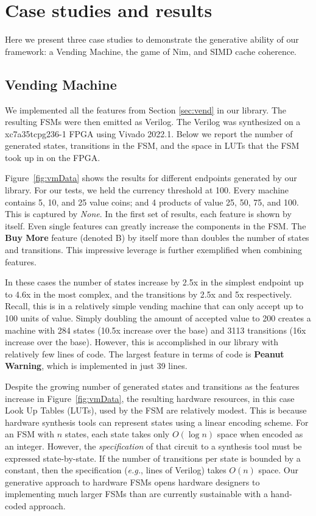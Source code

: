 \documentclass[sigplan,anonymous,review]{acmart}
\begin{document}
\section{Case studies and results}\label{sec:results}
Here we present three case studies to demonstrate the generative ability of our framework: a Vending Machine, the game of Nim, and SIMD cache coherence.

\subsection{Vending Machine}\label{sec:vendresults}
We implemented all the features from Section \ref{sec:vend} in our library. The resulting FSMs were then emitted as Verilog. The Verilog was synthesized on a xc7a35tcpg236-1 FPGA using Vivado 2022.1. Below we report the number of generated states, transitions in the FSM, and the space in LUTs that the FSM took up in on the FPGA.

Figure~\ref{fig:vmData} shows the results for different endpoints generated by our library. For our tests, we held the currency threshold at 100. Every machine contains 5, 10, and 25 value coins; and 4 products of value 25, 50, 75, and 100. This is captured by \emph{None}. In the first set of results, each feature is shown by itself. Even single features can greatly increase the components in the FSM. The \textbf{Buy More} feature (denoted B) by itself more than doubles the number of states and transitions. This impressive leverage is further exemplified when combining features. 

In these cases the number of states increase by 2.5x in the simplest endpoint up to 4.6x in the most complex, and the transitions by 2.5x and 5x respectively. Recall, this is in a relatively simple vending machine that can only accept up to 100 units of value. Simply doubling the amount of accepted value to 200 creates a machine with 284 states (10.5x increase over the base) and 3113 transitions (16x increase over the base). However, this is accomplished in our library with relatively few lines of code. The largest feature in terms of code is \textbf{Peanut Warning}, which is implemented in just 39 lines.

Despite the growing number of generated states and transitions as the features increase in Figure~\ref{fig:vmData}, the resulting hardware resources, in this case Look Up Tables (LUTs), used by the FSM are relatively modest. This is because hardware synthesis tools can represent states using a linear encoding scheme.  For an FSM with $n$ states, each state takes only $O(\log{n})$ space when encoded as an integer.  However, the \emph{specification} of that circuit to a synthesis tool must be expressed state-by-state.  If the number of transitions per state is bounded by a constant, then the specification (\textit{e.g.}, lines of Verilog) takes $O(n)$ space.  Our generative approach to hardware FSMs opens hardware designers to implementing much larger FSMs than are currently sustainable with a hand-coded approach.
\end{document}
